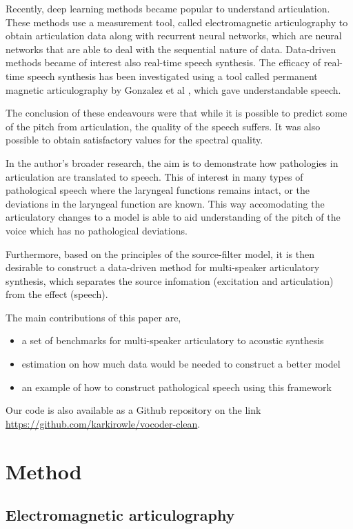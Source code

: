 \documentclass[a4paper]{article}
\begin{document}
Recently, deep learning methods became popular
to understand articulation. These methods use a measurement tool,
called electromagnetic articulography to obtain articulation data 
\cite{Aryal2016} \cite{Taguchi} \cite{Liu2018} along with recurrent
neural networks, which are neural networks that are able to deal with
the sequential nature of data. Data-driven methods became of interest also
real-time speech synthesis. The efficacy of real-time speech synthesis
has been investigated using a tool called permanent magnetic articulography
by Gonzalez et al \cite{Gonzalez2017}, which gave understandable
speech.

The conclusion of these endeavours were that while it is possible to
predict some of the pitch from articulation, the quality of the speech
suffers. It was also possible to obtain satisfactory values for the
spectral quality.

In the author's broader research, the aim is to demonstrate how pathologies in
articulation are translated to speech. This of interest in many types
of pathological speech where the laryngeal functions remains intact, or
the deviations in the laryngeal function are known. This way accomodating
the articulatory changes to a model is able to aid understanding of
the pitch of the voice which has no pathological deviations.

Furthermore, based on the principles of the source-filter model,
it is then desirable to construct a data-driven method for
multi-speaker articulatory synthesis, which separates the source infomation
(excitation and articulation) from the effect (speech). 

The main contributions of this paper are,
\begin{itemize}
\item a set of benchmarks for multi-speaker articulatory to acoustic synthesis
\item estimation on how much data would be needed to construct a better model
\item an example of how to construct pathological speech using this framework
\end{itemize}

Our code is also available as a Github repository on the link
\url{https://github.com/karkirowle/vocoder-clean}.

\section{Method}
\subsection{Electromagnetic articulography}
\end{document}
